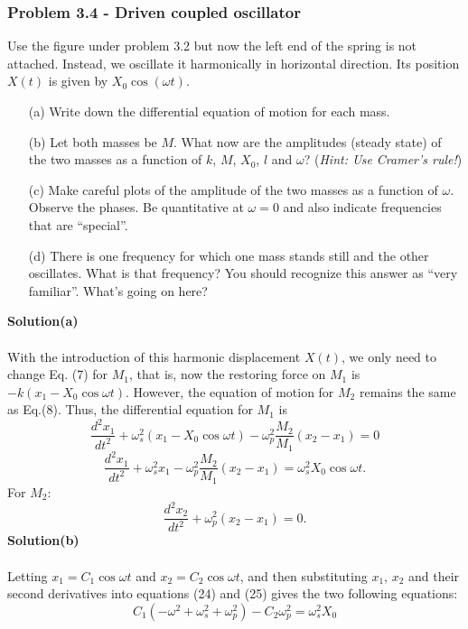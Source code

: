 \documentclass[12pt,a4paper]{article}
\begin{document}
\subsubsection*{Problem 3.4 - Driven coupled oscillator}
Use the figure under problem 3.2 but now the left end of the spring is not attached. Instead, we oscillate it harmonically in horizontal direction. Its position $X(t)$ is given by $X_0\cos(\omega t)$.
\begin{enumerate}
    \item[(a)]Write down the differential equation of motion for each mass.
    \item[(b)]Let both masses be $M$. What now are the amplitudes (steady state) of the two masses as a function of $k$, $M$, $X_0$, $l$ and $\omega$? (\textit{Hint: Use Cramer’s rule!})
    \item[(c)]Make careful plots of the amplitude of the two masses as a function of $\omega$. Observe the phases. Be quantitative at $\omega=0$ and also indicate frequencies that are “special”.
    \item[(d)]There is one frequency for which one mass stands still and the other oscillates. What is that frequency? You should recognize this answer as “very familiar”. What’s going on here?
\end{enumerate}
\textbf{Solution(a)}
\\
\\With the introduction of this harmonic displacement $X(t)$, we only need to change Eq. (7) for $M_1$, that is, now the restoring force on $M_1$ is $-k(x_1-X_0\cos\omega t)$. However, the equation of motion for $M_2$ remains the same as Eq.(8). Thus, the differential equation for $M_1$ is
\[\frac{d^2x_1}{dt^2}+\omega_s^2(x_1-X_0\cos\omega t)-\omega_p^2\frac{M_2}{M_1}(x_2-x_1)=0\]
\begin{equation}
    \frac{d^2x_1}{dt^2}+\omega_s^2x_1-\omega_p^2\frac{M_2}{M_1}(x_2-x_1)=\omega_s^2X_0\cos\omega t.
\end{equation}
For $M_2$:
\begin{equation}
     \frac{d^2x_2}{dt^2}+\omega_p^2(x_2-x_1)=0.
\end{equation}
\textbf{Solution(b)}
\\
\\Letting $x_1=C_1\cos\omega t$ and $x_2=C_2\cos\omega t$, and then substituting $x_1$, $x_2$ and their second derivatives into equations (24) and (25) gives the two following equations:
\begin{equation}
    C_1\left(-\omega^2+\omega_s^2+\omega_p^2\right)-C_2\omega_p^2=\omega_s^2X_0
\end{equation}
\end{document}
